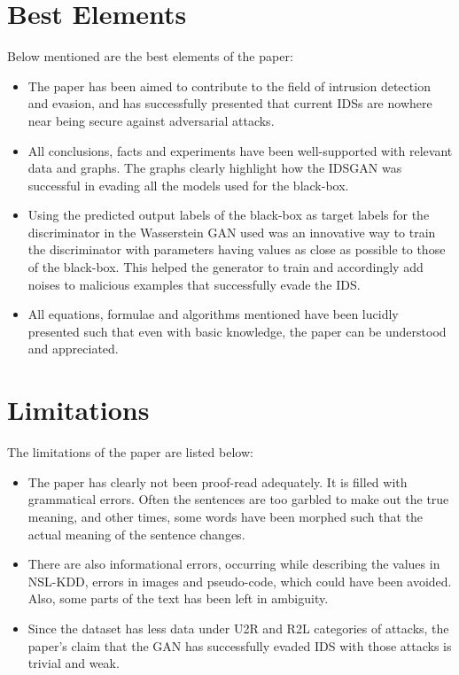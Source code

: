 \documentclass[twoside,twocolumn]{article}
\begin{document}
\section{Best Elements}
Below mentioned are the best elements of the paper:
\begin{itemize}

\item The paper has been aimed to contribute to the field of intrusion detection and evasion, and has successfully presented that current IDSs are nowhere near being secure against adversarial attacks.

\item All conclusions, facts and experiments have been well-supported with relevant data and graphs. The graphs clearly highlight how the IDSGAN was successful in evading all the models used for the black-box.

\item Using the predicted output labels of the black-box as target labels for the discriminator in the Wasserstein GAN used was an innovative way to train the discriminator with parameters having values as close as possible to those of the black-box. This helped the generator to train and accordingly add noises to malicious examples that successfully evade the IDS.

\item All equations, formulae and algorithms mentioned have been lucidly presented such that even with basic knowledge, the paper can be understood and appreciated.

\end{itemize}
%
\section{Limitations}
The limitations of the paper are listed below:
\begin{itemize}

\item The paper has clearly not been proof-read adequately. It is filled with grammatical errors. Often the sentences are too garbled to make out the true meaning, and other times, some words have been morphed such that the actual meaning of the sentence changes.

\item There are also informational errors, occurring while describing the values in NSL-KDD, errors in images and pseudo-code, which could have been avoided. Also, some parts of the text has been left in ambiguity.

\item Since the dataset has less data under U2R and R2L categories of attacks, the paper's claim that the GAN has successfully evaded IDS with those attacks is trivial and weak.

\end{itemize}
%
%
\end{document}
